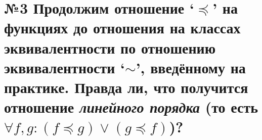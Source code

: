 
\section*{№3 Продолжим отношение `$\preceq$' на функциях до отношения на классах эквивалентности по отношению эквивалентности `$\sim$', введённому на практике. Правда ли, что получится отношение \textit{линейного порядка} (то есть $\forall f, g: (f \preceq g) \lor (g \preceq f)$)?}
